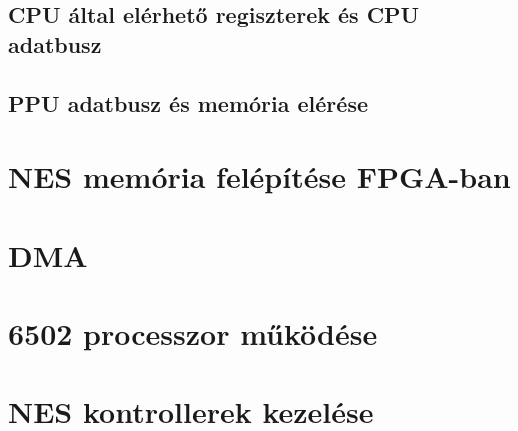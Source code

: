 	\subsection{CPU által elérhető regiszterek és CPU adatbusz}
	
	\subsection{PPU adatbusz és memória elérése}

\section{NES memória felépítése FPGA-ban}

\section{DMA}

\section{6502 processzor működése}

\section{NES kontrollerek kezelése}